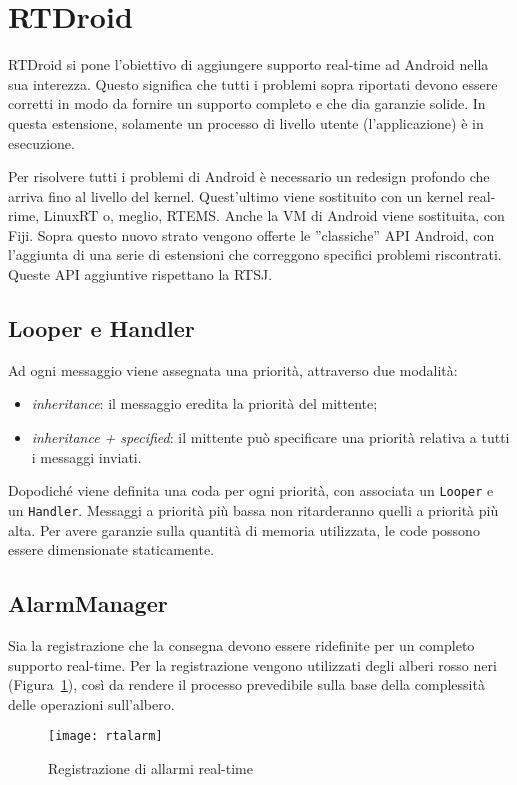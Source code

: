 \section{RTDroid}
RTDroid si pone l'obiettivo di aggiungere supporto real-time ad Android nella sua interezza. Questo significa che tutti i problemi sopra riportati devono essere corretti in modo da fornire un supporto completo e che dia garanzie solide. In questa estensione, solamente un processo di livello utente (l'applicazione) è in esecuzione. 

Per risolvere tutti i problemi di Android è necessario un redesign profondo che arriva fino al livello del kernel. Quest'ultimo viene sostituito con un kernel real-rime, LinuxRT o, meglio, RTEMS. Anche la VM di Android viene sostituita, con Fiji. Sopra questo nuovo strato vengono offerte le ''classiche'' API Android, con l'aggiunta di una serie di estensioni che correggono specifici problemi riscontrati. Queste API aggiuntive rispettano la RTSJ. 

\subsection{Looper e Handler}
Ad ogni messaggio viene assegnata una priorità, attraverso due modalità:
\begin{itemize}
	\item\textit{inheritance}: il messaggio eredita la priorità del mittente;
	\item\textit{inheritance + specified}: il mittente può specificare una priorità relativa a tutti i messaggi inviati.
\end{itemize}
Dopodiché viene definita una coda per ogni priorità, con associata un \texttt{Looper} e un \texttt{Handler}. Messaggi a priorità più bassa non ritarderanno quelli a priorità più alta. Per avere garanzie sulla quantità di memoria utilizzata, le code possono essere dimensionate staticamente.

\subsection{AlarmManager}
Sia la registrazione che la consegna devono essere ridefinite per un completo supporto real-time. Per la registrazione vengono utilizzati degli alberi rosso neri (Figura~\ref{fig:rtalarm}), così da rendere il processo prevedibile sulla base della complessità delle operazioni sull'albero. 
\begin{figure}[h]
	\centering
	\texttt{[image: rtalarm]}
	\caption{Registrazione di allarmi real-time}
	\label{fig:rtalarm}
\end{figure}

